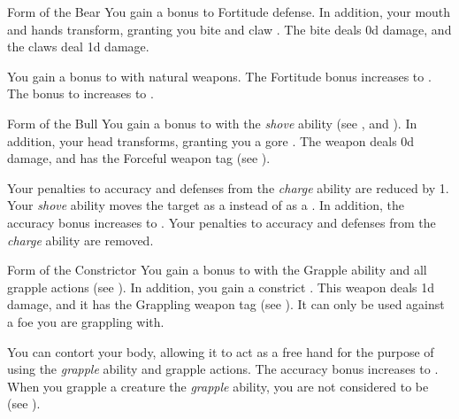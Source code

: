         {
            \begin{freeability}{Form of the Bear}
                You gain a  bonus to Fortitude defense.
                In addition, your mouth and hands transform, granting you bite and claw .
                The bite deals \plus0d damage, and the claws deal \minus1d damage.

                \rankline
                 You gain a  bonus to  with natural weapons.
                 The Fortitude bonus increases to .
                 The bonus to  increases to .
            \end{freeability}

            \begin{freeability}{Form of the Bull}
                You gain a  bonus to  with the \textit{shove} ability (see , and ).
                In addition, your head transforms, granting you a gore .
                The weapon deals \plus0d damage, and has the Forceful weapon tag (see ).

                \rankline
                 Your penalties to accuracy and defenses from the \textit{charge} ability are reduced by 1.
                 Your \textit{shove} ability moves the target as a  instead of as a .
                In addition, the accuracy bonus increases to .
                 Your penalties to accuracy and defenses from the \textit{charge} ability are removed.
            \end{freeability}

            \begin{freeability}{Form of the Constrictor}
                You gain a  bonus to  with the Grapple ability and all grapple actions (see ).
                In addition, you gain a constrict .
                This weapon deals \plus1d damage, and it has the Grappling weapon tag (see ).
                It can only be used against a foe you are grappling with.

                \rankline
                 You can contort your body, allowing it to act as a free hand for the purpose of using the \textit{grapple} ability and grapple actions.
                 The accuracy bonus increases to .
                 When you grapple a creature the \textit{grapple} ability, you are not considered to be  (see ).
            \end{freeability}

}
